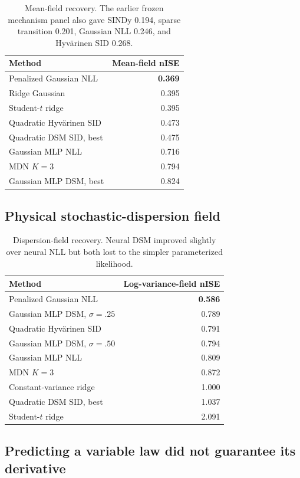 \documentclass[10pt]{article}
\newcommand{\best}[1]{\ifmmode\boldsymbol{#1}\else\textbf{#1}\fi}
\begin{document}
\begin{table}[H]
\centering\small
\begin{tabularx}{0.78\linewidth}{Y r}
\toprule Method & Mean-field nISE \\
\midrule
Penalized Gaussian NLL & \best{0.369} \\
Ridge Gaussian & 0.395 \\
Student-$t$ ridge & 0.395 \\
Quadratic Hyv\"arinen SID & 0.473 \\
Quadratic DSM SID, best & 0.475 \\
Gaussian MLP NLL & 0.716 \\
MDN $K=3$ & 0.794 \\
Gaussian MLP DSM, best & 0.824 \\
\bottomrule
\end{tabularx}
\caption{Mean-field recovery. The earlier frozen mechanism panel also gave SINDy 0.194, sparse transition 0.201, Gaussian NLL 0.246, and Hyv\"arinen SID 0.268.}
\end{table}

\subsection{Physical stochastic-dispersion field}

\begin{table}[H]
\centering\small
\begin{tabularx}{0.82\linewidth}{Y r}
\toprule Method & Log-variance-field nISE \\
\midrule
Penalized Gaussian NLL & \best{0.586} \\
Gaussian MLP DSM, $\sigma=.25$ & 0.789 \\
Quadratic Hyv\"arinen SID & 0.791 \\
Gaussian MLP DSM, $\sigma=.50$ & 0.794 \\
Gaussian MLP NLL & 0.809 \\
MDN $K=3$ & 0.872 \\
Constant-variance ridge & 1.000 \\
Quadratic DSM SID, best & 1.037 \\
Student-$t$ ridge & 2.091 \\
\bottomrule
\end{tabularx}
\caption{Dispersion-field recovery. Neural DSM improved slightly over neural NLL but both lost to the simpler parameterized likelihood.}
\end{table}

\subsection{Predicting a variable law did not guarantee its derivative}
\end{document}
